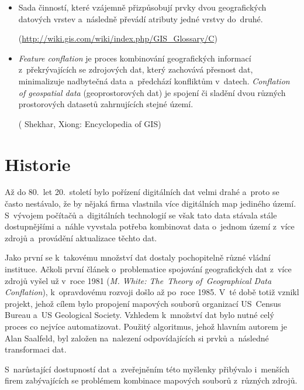 \begin{itemize}
  \item Sada činností, které vzájemně přizpůsobují prvky dvou geografických
    datových vrstev a~následně převádí atributy jedné vrstvy do~druhé. %
    
    (\url{http://wiki.gis.com/wiki/index.php/GIS\_Glossary/C})
  
  \item \textit{Feature conflation} je proces kombinování geografických 
    informací z~překrývajících se zdrojových dat, který zachovává přesnost 
    dat, minimalizuje nadbytečná data a~předchází konfliktům v~datech. %
    \textit{Conflation of geospatial data} (geoprostorových dat) je spojení
    či sladění dvou různých prostorových datasetů zahrnujících stejné území.
    
     (\cite{gisencyclopedia} Shekhar, Xiong: Encyclopedia of GIS)

\end{itemize}

\section{Historie} %
\label{historie}

Až do 80.~let 20.~století bylo pořízení digitálních dat velmi drahé a~proto 
se často nestávalo, že by nějaká firma vlastnila více digitálních map jediného 
území. S~vývojem počítačů a~digitálních technologií se však tato data stávala 
stále dostupnějšími a~náhle vyvstala potřeba kombinovat data o~jednom území 
z~více zdrojů a~provádění aktualizace těchto dat. 

Jako první se k~takovému množství dat dostaly pochopitelně různé vládní 
instituce. Ačkoli první článek o~problematice spojování geografických dat 
z~více zdrojů vyšel už v~roce 1981 (\textit{M. White: The~Theory of~Geographical
Data Conflation}), k~opravdovému rozvoji došlo až po~roce 1985. V~té době 
totiž vznikl projekt, jehož cílem bylo propojení mapových souborů organizací
US~Census Bureau a~US Geological Society. Vzhledem k~množství dat bylo nutné
celý proces co nejvíce automatizovat. Použitý algoritmus, jehož hlavním autorem
je Alan Saalfeld, byl založen na~nalezení odpovídajících si prvků a~následné 
transformaci dat. 

S~narůstající dostupností dat a~zveřejněním této myšlenky přibývalo i~menších 
firem zabývajících se problémem kombinace mapových souborů z~různých zdrojů.

